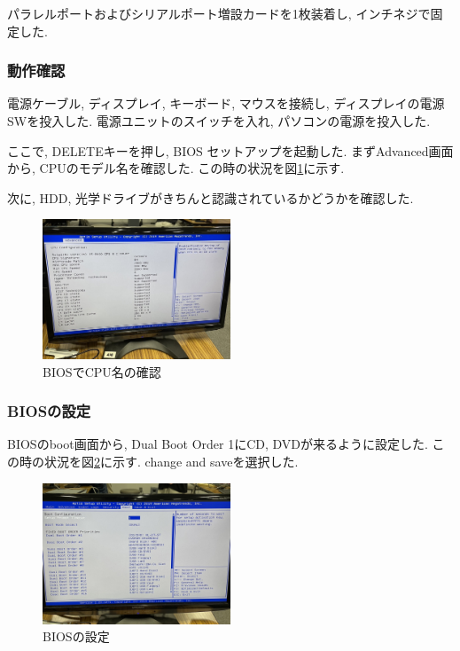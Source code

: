 \documentclass{ltjsarticle} %
\begin{document}
パラレルポートおよびシリアルポート増設カードを1枚装着し, インチネジで固定した.

\subsubsection{動作確認}
電源ケーブル, ディスプレイ, キーボード, マウスを接続し, ディスプレイの電源SWを投入した.
電源ユニットのスイッチを入れ, パソコンの電源を投⼊した.

ここで, DELETEキーを押し,  BIOS セットアップを起動した.
まずAdvanced画面から, CPUのモデル名を確認した. この時の状況を図\ref{fig:bios1}に示す.

次に, HDD, 光学ドライブがきちんと認識されているかどうかを確認した. 

\begin{figure}[H] %
  \centering
  \includegraphics[width=0.5\textwidth]{bios1.jpg} %
  \caption{BIOSでCPU名の確認} %
  \label{fig:bios1} %
\end{figure}

\subsubsection{BIOSの設定}

BIOSのboot画面から, Dual Boot Order 1にCD, DVDが来るように設定した.
この時の状況を図\ref{fig:bios2}に示す.
change and saveを選択した.

\begin{figure}[H] %
  \centering
  \includegraphics[width=0.5\textwidth]{bios2.jpg} %
  \caption{BIOSの設定} %
  \label{fig:bios2} %
\end{figure}
\end{document}
